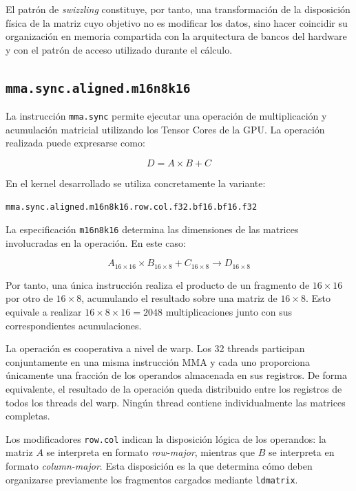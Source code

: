El patrón de \textit{swizzling} constituye, por tanto, una transformación de la disposición física de la matriz cuyo objetivo no es modificar los datos, sino hacer coincidir su organización en memoria compartida con la arquitectura de bancos del hardware y con el patrón de acceso utilizado durante el cálculo.

\subsection{\texttt{mma.sync.aligned.m16n8k16}}

La instrucción \texttt{mma.sync} permite ejecutar una operación de multiplicación y acumulación matricial utilizando los Tensor Cores de la GPU. La operación realizada puede expresarse como: \cite{nvidiaPTX}

$$
D = A \times B + C
$$

En el kernel desarrollado se utiliza concretamente la variante:

\begin{verbatim}
mma.sync.aligned.m16n8k16.row.col.f32.bf16.bf16.f32
\end{verbatim}

La especificación \texttt{m16n8k16} determina las dimensiones de las matrices involucradas en la operación. En este caso:

$$
A_{16\times16} \times B_{16\times8} + C_{16\times8}
\rightarrow D_{16\times8}
$$

Por tanto, una única instrucción realiza el producto de un fragmento de \(16\times16\) por otro de \(16\times8\), acumulando el resultado sobre una matriz de \(16\times8\). Esto equivale a realizar \(16\times8\times16=2048\) multiplicaciones junto con sus correspondientes acumulaciones.

La operación es cooperativa a nivel de warp. Los 32 threads participan conjuntamente en una misma instrucción MMA y cada uno proporciona únicamente una fracción de los operandos almacenada en sus registros. De forma equivalente, el resultado de la operación queda distribuido entre los registros de todos los threads del warp. Ningún thread contiene individualmente las matrices completas.

Los modificadores \texttt{row.col} indican la disposición lógica de los operandos: la matriz \(A\) se interpreta en formato \textit{row-major}, mientras que \(B\) se interpreta en formato \textit{column-major}. Esta disposición es la que determina cómo deben organizarse previamente los fragmentos cargados mediante \texttt{ldmatrix}.

